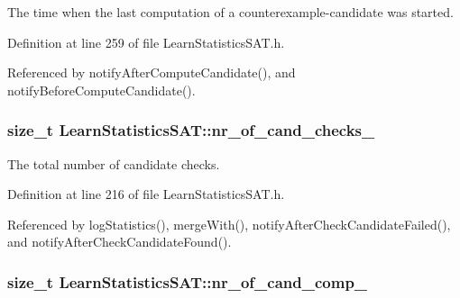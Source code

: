 The time when the last computation of a counterexample-\/candidate was started. 



Definition at line 259 of file Learn\-Statistics\-S\-A\-T.\-h.



Referenced by notify\-After\-Compute\-Candidate(), and notify\-Before\-Compute\-Candidate().

\hypertarget{classLearnStatisticsSAT_a1c3b6dff92cbcec06c944606c3555b64}{
\subsubsection[{nr\-\_\-of\-\_\-cand\-\_\-checks\-\_\-}]{\setlength{\rightskip}{0pt plus 5cm}size\-\_\-t Learn\-Statistics\-S\-A\-T\-::nr\-\_\-of\-\_\-cand\-\_\-checks\-\_\-\hspace{0.3cm}{\ttfamily [protected]}}}\label{classLearnStatisticsSAT_a1c3b6dff92cbcec06c944606c3555b64}


The total number of candidate checks. 



Definition at line 216 of file Learn\-Statistics\-S\-A\-T.\-h.



Referenced by log\-Statistics(), merge\-With(), notify\-After\-Check\-Candidate\-Failed(), and notify\-After\-Check\-Candidate\-Found().

\hypertarget{classLearnStatisticsSAT_a02de895c31e4c58396d5f07154e21561}{
\subsubsection[{nr\-\_\-of\-\_\-cand\-\_\-comp\-\_\-}]{\setlength{\rightskip}{0pt plus 5cm}size\-\_\-t Learn\-Statistics\-S\-A\-T\-::nr\-\_\-of\-\_\-cand\-\_\-comp\-\_\-\hspace{0.3cm}{\ttfamily [protected]}}}\label{classLearnStatisticsSAT_a02de895c31e4c58396d5f07154e21561}


